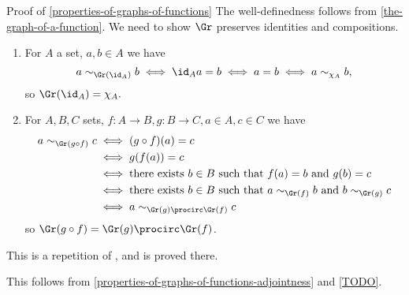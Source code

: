 \begin{Proof}{Proof of \cref{properties-of-graphs-of-functions}}%
    The well-definedness follows from \cref{the-graph-of-a-function}. We need to show $\Gr$ preserves identities and compositions.
    \begin{enumerate}
      \item {} For $A$ a set, $a,b \in A$ we have
            \[ a \sim_{\Gr(\id_A)} b \iff \id_A a = b \iff a = b \iff a \sim_{\chi_A} b, \]
            so $\Gr(\id_A) = \chi_A.$
      \item {} For $A, B, C$ sets, $f \colon A \to B, g \colon B \to C, a \in A, c \in C$ we have
            \begin{align*}
              a \sim_{\Gr (g \circ f)} c &\iff (g \circ f)(a) = c\\
                                       &\iff g(f(a)) = c\\
                                       &\iff \text{there exists } b \in B \text{ such that } f(a) = b \text{ and } g(b) = c\\
                                       &\iff \text{there exists } b \in B \text{ such that } a \sim_{\Gr(f)} b \text{ and } b \sim_{\Gr(g)} c \\
                                       &\iff a \sim_{\Gr(g) \procirc \Gr(f)} c

            \end{align*}
            so $\Gr(g \circ f) = \Gr(g) \procirc \Gr(f)$.
    \end{enumerate}
    This is a repetition of , and is proved there.

    This follows from \cref{properties-of-graphs-of-functions-adjointness} and \cref{TODO}.


\end{Proof}
